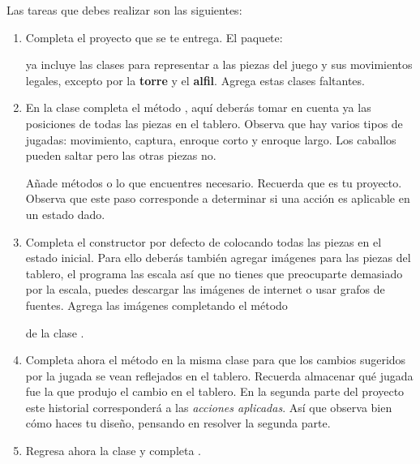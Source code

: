 Las tareas que debes realizar son las siguientes:
\begin{enumerate}
\subsubsection{Parte I: Reglas del ajedrez}
 \item Completa el proyecto que se te entrega.  El paquete:
\begin{center}
\end{center}
  ya incluye las clases para representar a las piezas del juego y sus movimientos legales, excepto por la \textbf{torre} y el \textbf{alfil}.  Agrega estas clases faltantes.

 \item En la clase  completa el método , aquí deberás tomar en cuenta ya las posiciones de todas las piezas en el tablero.  Observa que hay varios tipos de jugadas: movimiento, captura, enroque corto y enroque largo. Los caballos pueden saltar pero las otras piezas no.

 Añade métodos o lo que encuentres necesario.  Recuerda que es tu proyecto.  Observa que este paso corresponde a determinar si una acción es aplicable en un estado dado.

 \item Completa el constructor por defecto de  colocando todas las piezas en el estado inicial.  Para ello deberás también agregar imágenes para las piezas del tablero, el programa las escala así que no tienes que preocuparte demasiado por la escala, puedes descargar las imágenes de internet o usar grafos de fuentes.  Agrega las imágenes completando el método
 \begin{center}
 \end{center}
 de la clase .


 \item Completa ahora el método  en la misma clase para que los cambios sugeridos por la jugada se vean reflejados en el tablero.  Recuerda almacenar qué jugada fue la que produjo el cambio en el tablero.  En la segunda parte del proyecto este historial corresponderá a las \emph{acciones aplicadas}.  Así que observa bien cómo haces tu diseño, pensando en resolver la segunda parte.

 \item Regresa ahora la clase  y completa .


\end{enumerate}
